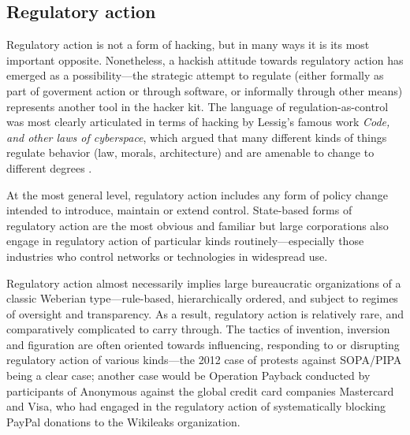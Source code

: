 \documentclass[10pt,letter,oneside]{scrartcl}
\begin{document}
\subsection*{Regulatory action}

Regulatory action is not a form of hacking, but in many ways it is its most 
important opposite.  Nonetheless, a hackish attitude towards regulatory action 
has emerged as a possibility---the strategic attempt to regulate (either 
formally as part of goverment action or through software, or informally through 
other means) represents another tool in the hacker kit.  The language of 
regulation-as-control was most clearly articulated in terms of hacking by 
Lessig's famous work \emph{Code, and other laws of cyberspace}, which argued 
that many different kinds of things regulate behavior (law, morals,
architecture) and are amenable to change to different degrees 
\cite{lessig2000code}.

At the most general level, regulatory action includes any form of policy change
intended to introduce, maintain or extend control.  State-based forms of
regulatory action are the most obvious and familiar but large corporations also
engage in regulatory action of particular kinds routinely---especially those
industries who control networks or technologies in widespread use.

Regulatory action almost necessarily implies large bureaucratic organizations of
a classic Weberian type---rule-based, hierarchically ordered, and subject to
regimes of oversight and transparency.  As a result, regulatory action is
relatively rare, and comparatively complicated to carry through.  The tactics of
invention, inversion and figuration are often oriented towards influencing,
responding to or disrupting regulatory action of various kinds---the 2012 case
of protests against SOPA/PIPA being a clear case; another case would be
Operation Payback conducted by participants of Anonymous against the global 
credit card companies Mastercard and Visa, who had engaged in the regulatory 
action of systematically blocking PayPal donations to the Wikileaks organization.

\end{document}
